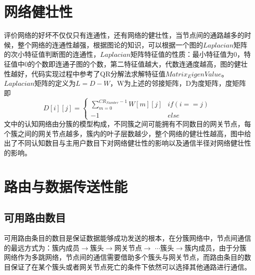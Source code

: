 \documentclass[a4paper,AutoFakeBold,oneside,12pt]{book}
\begin{document}
  \section{网络健壮性}
  评价网络的好坏不仅仅只有连通性，还有网络的健壮性，当节点间的通路越多的时候，整个网络的连通性越强，根据图论的知识，可以根据一个图的$Laplacian$矩阵的次小特征值判断图的连通性，$Laplacian$矩阵特征值的性质：最小特征值为0，特征值中0的个数即连通子图的个数，第二特征值越大，代数连通度越高，图的健壮性越好，代码实现过程中参考了QR分解法求解特征值$Matrix_EigenValue$。$Laplacian$矩阵的定义为$L=D-W$，W为上述的邻接矩阵，D为度矩阵，度矩阵即
   \begin{equation}
  D[i][j]=
\left\{  
             \begin{array}{lr}  
             
           \displaystyle { \sum_{m=0}^{CR_{Number}-1}} W[m][j] &if(i==j)\\  
             -1 &else
             \end{array}  
\right.  
\end{equation}
  文中的认知网络由分簇的模型构成，不同簇之间可能拥有不同数目的网关节点，每个簇之间的网关节点越多，簇内的叶子层数越少，整个网络的健壮性越高，图中给出了不同认知数目与主用户数目下对网络健壮性的影响以及通信半径对网络健壮性的影响。
  
 \section{路由与数据传送性能}
  \subsection{可用路由数目}
  可用路由条目的数目是保证数据能够成功发送的根本，在分簇网络中，节点间通信的最远方式为：簇内成员$\to$簇头$\to$网关节点$\to$ $\cdots$簇头$\to$簇内成员，由于分簇网络作为多跳网络，节点间的通信需要借助多个簇头与网关节点，而路由条目的数目保证了在某个簇头或者网关节点死亡的条件下依然可以选择其他通路进行通信。
  
\end{document}
